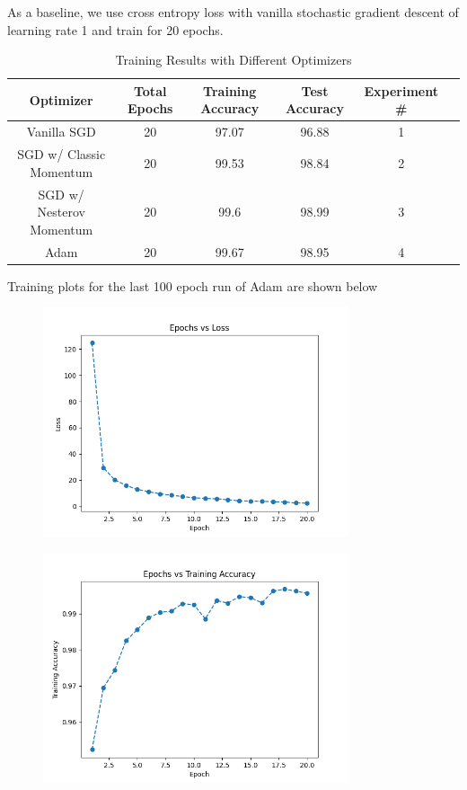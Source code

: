 \documentclass[11pt]{article}
\theoremstyle{definition}
\begin{document}
As a baseline, we use cross entropy loss with vanilla stochastic gradient descent of learning rate 1 and train for 20 epochs.




\begin{table}[H]
\centering
\begin{tabular}{| c | c | c | c | c | c |}
\hline
Optimizer & Total Epochs & Training Accuracy & Test Accuracy & Experiment \#\\
\hline
Vanilla SGD & 20 & 97.07 & 96.88  & 1\\
\hline
SGD w/ Classic Momentum & 20 & 99.53 & 98.84 & 2 \\
\hline
SGD w/ Nesterov Momentum & 20 & 99.6 & 98.99 & 3 \\
\hline
Adam & 20 &  99.67 & 98.95 & 4 \\
\hline
\end{tabular}
\caption{Training Results with Different Optimizers}
\end{table}

Training plots for the last 100 epoch run of Adam are shown below
\begin{figure}[H]
\begin{center}
  \includegraphics[width=9cm,keepaspectratio]{images/loss.png}
\end{center}
\end{figure}

\begin{figure}[H]
\begin{center}
  \includegraphics[width=9cm,keepaspectratio]{images/train_acc.png}
\end{center}
\end{figure}
\end{document}
